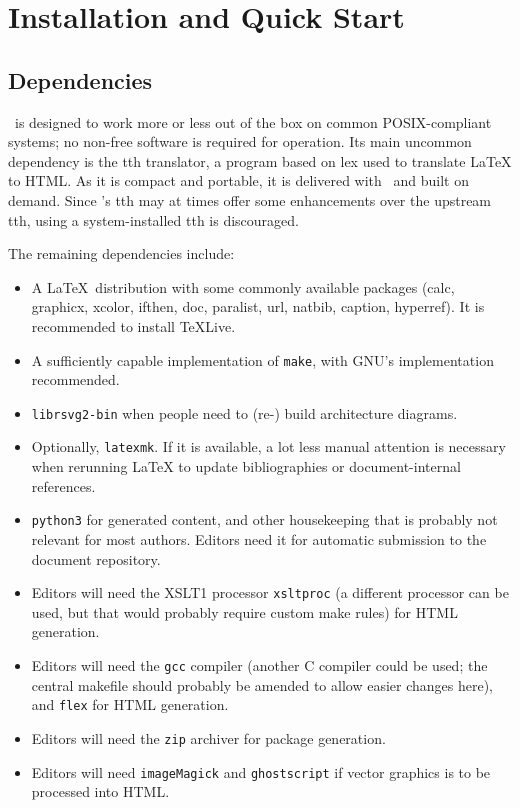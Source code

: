 \documentclass[11pt,a4paper]{ivoa}
\begin{document}
\section{Installation and Quick Start}
\label{sect:quick}

\subsection{Dependencies}

\ivoatex\ is designed to work more or less out of the box on common
POSIX-compliant systems; no non-free software is required for operation.
Its main uncommon dependency is the tth translator, 
a program based on lex used to translate LaTeX
to HTML.  As it is compact and portable, it is delivered with
\ivoatex~and built on demand.
Since \ivoatex's tth may at times offer
some enhancements over the upstream tth, using a system-installed tth is
discouraged.

The remaining dependencies include:

\begin{itemize}
\item A \LaTeX\ distribution with some commonly available packages (calc,
graphicx, xcolor, ifthen, doc, paralist, url, natbib, caption,
hyperref).
It is recommended to install TeXLive.
\item A sufficiently capable implementation of \texttt{make}, with GNU's
implementation recommended.
\item \texttt{librsvg2-bin} when people need to (re-) build architecture
diagrams.
\item Optionally, \texttt{latexmk}.  If it is available, a lot less
manual attention is necessary when rerunning LaTeX to update
bibliographies or document-internal references.
\item \texttt{python3} for  generated content, and other housekeeping
that is probably not relevant for most authors.  Editors need it for
automatic submission to the document repository.
\item Editors will need the XSLT1 processor 
\texttt{xsltproc} (a different processor can
be used, but that would probably require custom make rules) for HTML
generation.
\item Editors will need the 
\texttt{gcc} compiler (another C compiler could be used; the
central makefile should probably be amended to allow easier changes
here), and \texttt{flex} for HTML generation.
\item Editors will need the \texttt{zip} archiver for package generation.
\item Editors will need \texttt{imageMagick} and \texttt{ghostscript} if 
vector graphics is to be processed into HTML.
\end{itemize}
\end{document}
